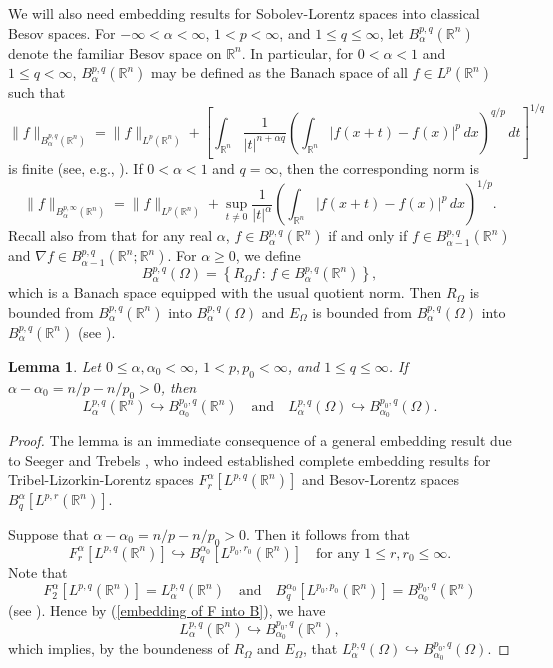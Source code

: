 \documentclass[reqno,centertags,11pt]{amsart}
\newtheorem{lem}[thm]{Lemma}
\theoremstyle{definition}
\numberwithin{thm}{section}
\numberwithin{equation}{section}
\newcommand{\R}{{\mathbb{R}}}
\begin{document}
We will  also need   embedding results for Sobolev-Lorentz spaces into classical Besov spaces. For $-\infty < \alpha <\infty$, $1<p<\infty$, and $1 \le q \le \infty$, let $B_\alpha^{p,q}(\R^n )$ denote the familiar Besov space on $\R^n$. In particular, for  $0< \alpha < 1$ and $1 \le q < \infty$,    $B_\alpha^{p,q}(\R^n )$ may be defined as  the Banach space of all $f\in L^p (\R^n )$ such that
\[
\|f\|_{B_\alpha^{p,q}(\R^n )}= \|f  \|_{L^{p}(\R^n  )}  +  \left[\int_{\R^n} \frac{1}{|t|^{n+\alpha q} }\left( \int_{\R^n} |f (x+t) -f (x)|^{p}\, dx \right)^{q/p} \, dt \right]^{1/q}
\]
is finite (see, e.g., \cite[p. 172]{JK}). If  $0< \alpha < 1$ and $  q = \infty$, then the corresponding norm  is
\[
\|f\|_{B_\alpha^{p,\infty}(\R^n )}= \|f  \|_{L^{p}(\R^n  )}  + \sup_{t \neq 0}\frac{1}{|t|^\alpha}\left( \int_{\R^n} |f (x+t) -f (x)|^{p}\, dx \right)^{1/p}  .
\]
Recall also from \cite[(2.13)]{JK} that
 for any real $\alpha$,
$f \in B_\alpha^{p,q}(\R^n )$ if and only if $f \in B_{\alpha-1}^{p,q}(\R^n )$ and $\nabla f \in B_{\alpha-1}^{p,q}(\R^n ;\R^n )$.
For $\alpha \ge 0$,   we define
$$
B_\alpha^{p,q}(\Omega ) = \left\{ R_\Omega f \,:\, f \in  B_\alpha^{p,q}(\R^n )\right\} ,
$$
which is a Banach space equipped with the usual quotient norm. Then $R_\Omega$ is bounded from  $B_\alpha^{p,q}(\R^n )$ into $B_\alpha^{p,q}(\Omega )$ and $E_\Omega$ is bounded from $B_\alpha^{p,q}(\Omega )$  into $B_\alpha^{p,q}(\R^n )$ (see \cite[Proposition 2.17]{JK}).


\begin{lem}\label{embedding of L into B on domain} Let $0 \le \alpha, \alpha_0 <\infty$, $1< p, p_0 <\infty$, and $ 1\le q   \le \infty$.
   If $\alpha-\alpha_0 = n/p-n/p_0 >0$, then
$$
L_\alpha^{p,q}(\R^n )\hookrightarrow B_{\alpha_0}^{p_0 , q}(\R^n )
\quad\mbox{and}\quad L_\alpha^{p,q}(\Omega )\hookrightarrow B_{\alpha_0}^{p_0 , q}(\Omega ).
$$
\end{lem}

\begin{proof} The lemma is   an immediate  consequence of a general embedding result  due to  Seeger and Trebels \cite{seeger}, who indeed   established complete  embedding results for   Tribel-Lizorkin-Lorentz spaces $F_r^\alpha [L^{p,q}(\R^n )]$ and   Besov-Lorentz spaces $B_q^\alpha [L^{p,r}(\R^n )]$.

Suppose that $\alpha-\alpha_0 =n/p-n/p_0 >0$. Then  it follows from  \cite[Theorem 1.2]{seeger} that
\begin{equation}\label{embedding of F into B}
F_r^\alpha [L^{p,q}(\R^n )] \hookrightarrow B_q^{\alpha_0} [L^{p_0, r_0}(\R^n )] \quad\mbox{for any}\,\, 1 \le r, r_0 \le \infty.
\end{equation}
Note that
$$
F_2^\alpha [L^{p,q}(\R^n )] =L_\alpha^{p,q} (\R^n )\quad\mbox{and}\quad
B_q^{\alpha_0} [L^{p_0,p_0}(\R^n )]= B_{\alpha_0}^{p_0, q}(\R^n )
$$
(see \cite[p. 1018]{seeger}). Hence by (\ref{embedding of F into B}), we  have
\[
L_\alpha^{p,q}(\R^n ) \hookrightarrow B_{\alpha_0}^{p_0 ,q}(\R^n ),
\]
which   implies, by the   boundeness  of $R_\Omega$ and $E_\Omega$, that
$L_\alpha^{p,q}(\Omega )   \hookrightarrow B_{\alpha_0}^{p_0 ,q}(\Omega )$.
\end{proof}
\end{document}
